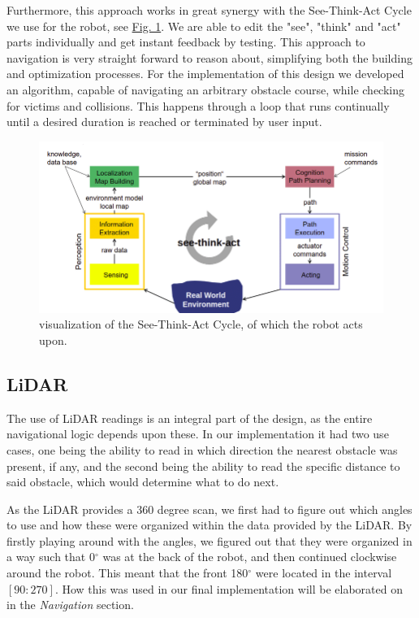 \documentclass[conference]{IEEEtran}
\begin{document}
Furthermore, this approach works in great synergy with the See-Think-Act Cycle we use for the robot, see \href{sec:STAC}{Fig. 1}.
We are able to edit the "see", "think" and "act" parts individually and get instant feedback by testing. 
This approach to navigation is very straight forward to reason about, simplifying both the building and optimization processes.
For the implementation of this design we developed an algorithm, capable of navigating an arbitrary obstacle course, while checking for victims and collisions.
This happens through a loop that runs continually until a desired duration is reached or terminated by user input. 
\begin{figure}[h]
    \centerline{\includegraphics[width=1.0\columnwidth]{Pictures/STAC.png}}
    \caption{visualization of the See-Think-Act Cycle, of which the robot acts upon.}
    \label{sec:STAC}
    \end{figure}

\subsection{LiDAR}
The use of LiDAR readings is an integral part of the design, as the entire navigational logic depends upon these.
In our implementation it had two use cases, one being the ability to read in which direction the nearest obstacle was present, if any, and the second being the ability to read the specific distance to said obstacle, which would determine what to do next.

As the LiDAR provides a 360 degree scan, we first had to figure out which angles to use and how these were organized within the data provided by the LiDAR.
By firstly playing around with the angles, we figured out that they were organized in a way such that 0$^\circ$ was at the back of the robot, and then continued clockwise around the robot.
This meant that the front 180$^\circ$ were located in the interval $[90:270]$. How this was used in our final implementation will be elaborated on in the \textit{Navigation} section.
\end{document}
